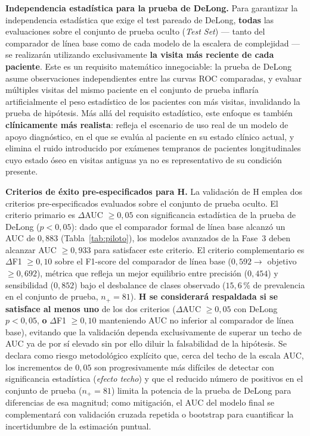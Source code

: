 \documentclass[../tesis.tex]{subfiles}
\begin{document}
\textbf{Independencia estadística para la prueba de DeLong.} Para garantizar la independencia estadística que exige el test pareado de DeLong, \textbf{todas} las evaluaciones sobre el conjunto de prueba oculto (\textit{Test Set}) --- tanto del comparador de línea base como de cada modelo de la escalera de complejidad --- se realizarán utilizando exclusivamente \textbf{la visita más reciente de cada paciente}. Este es un requisito matemático innegociable: la prueba de DeLong asume observaciones independientes entre las curvas ROC comparadas, y evaluar múltiples visitas del mismo paciente en el conjunto de prueba inflaría artificialmente el peso estadístico de los pacientes con más visitas, invalidando la prueba de hipótesis. Más allá del requisito estadístico, este enfoque es también \textbf{clínicamente más realista}: refleja el escenario de uso real de un modelo de apoyo diagnóstico, en el que se evalúa al paciente en su estado clínico actual, y elimina el ruido introducido por exámenes tempranos de pacientes longitudinales cuyo estado óseo en visitas antiguas ya no es representativo de su condición presente.

\textbf{Criterios de éxito pre-especificados para H.} La validación de H emplea dos criterios pre-especificados evaluados sobre el conjunto de prueba oculto. El criterio primario es $\Delta$AUC $\geq 0{,}05$ con significancia estadística de la prueba de DeLong ($p < 0{,}05$): dado que el comparador formal de línea base alcanzó un AUC de $0{,}883$ (Tabla~\ref{tab:piloto}), los modelos avanzados de la Fase~3 deben alcanzar AUC $\geq 0{,}933$ para satisfacer este criterio. El criterio complementario es $\Delta$F1 $\geq 0{,}10$ sobre el F1-score del comparador de línea base ($0{,}592 \rightarrow$ objetivo $\geq 0{,}692$), métrica que refleja un mejor equilibrio entre precisión ($0{,}454$) y sensibilidad ($0{,}852$) bajo el desbalance de clases observado ($15{,}6$\,\% de prevalencia en el conjunto de prueba, $n_+ = 81$). \textbf{H se considerará respaldada si se satisface al menos uno} de los dos criterios ($\Delta$AUC $\geq 0{,}05$ con DeLong $p < 0{,}05$, \textbf{o} $\Delta$F1 $\geq 0{,}10$ manteniendo AUC no inferior al comparador de línea base), evitando que la validación dependa exclusivamente de superar un techo de AUC ya de por sí elevado sin por ello diluir la falsabilidad de la hipótesis. Se declara como riesgo metodológico explícito que, cerca del techo de la escala AUC, los incrementos de $0{,}05$ son progresivamente más difíciles de detectar con significancia estadística (\textit{efecto techo}) y que el reducido número de positivos en el conjunto de prueba ($n_+ = 81$) limita la potencia de la prueba de DeLong para diferencias de esa magnitud; como mitigación, el AUC del modelo final se complementará con validación cruzada repetida o bootstrap para cuantificar la incertidumbre de la estimación puntual.
\end{document}
